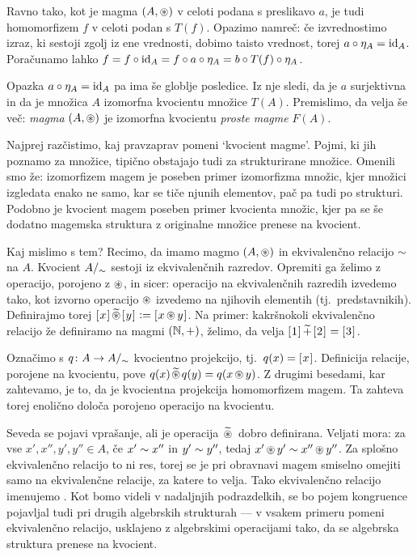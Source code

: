 Ravno tako, kot je magma $(A, \oper)$ v celoti podana s preslikavo $a$, je tudi homomorfizem $f$ v celoti podan s $T(f)$. Opazimo namreč: če izvrednostimo izraz, ki sestoji zgolj iz ene vrednosti, dobimo taisto vrednost, torej $a \circ \eta_A = \id[A]$. Poračunamo lahko $f = f \circ \id[A] = f \circ a \circ \eta_A = b \circ T(f) \circ \eta_A$.

Opazka $a \circ \eta_A = \id[A]$ pa ima še globlje posledice. Iz nje sledi, da je $a$ surjektivna in da je  množica $A$ izomorfna kvocientu množice $T(A)$. Premislimo, da velja še več: \emph{magma} $(A, \oper)$ je izomorfna kvocientu \emph{proste magme} $F(A)$.

Najprej razčistimo, kaj pravzaprav pomeni `kvocient magme'. Pojmi, ki jih poznamo za množice, tipično obstajajo tudi za strukturirane množice. Omenili smo že: izomorfizem magem je poseben primer izomorfizma množic, kjer množici izgledata enako ne samo, kar se tiče njunih elementov, pač pa tudi po strukturi. Podobno je kvocient magem poseben primer kvocienta množic, kjer pa se še dodatno magemska struktura z originalne množice prenese na kvocient.

Kaj mislimo s tem? Recimo, da imamo magmo $(A, \oper)$ in ekvivalenčno relacijo $\equ$ na $A$. Kvocient $A/_\equ$ sestoji iz ekvivalenčnih razredov. Opremiti ga želimo z operacijo, porojeno z $\oper$, in sicer: operacijo na ekvivalenčnih razredih izvedemo tako, kot izvorno operacijo $\oper$ izvedemo na njihovih elementih (tj.~predstavnikih). Definirajmo torej $\ec{x} \qo{\oper} \ec{y} \dfeq \ec{x \oper y}$. Na primer: kakršnokoli ekvivalenčno relacijo že definiramo na magmi $(\NN, +)$, želimo, da velja $\ec{1} \qo{+} \ec{2} = \ec{3}$.

Označimo s $q\colon A \to A/_\equ$ kvocientno projekcijo, tj.~$q(x) = \ec{x}$. Definicija relacije, porojene na kvocientu, pove $q(x) \qo{\oper} q(y) = q(x \oper y)$. Z drugimi besedami, kar zahtevamo, je to, da je kvocientna projekcija homomorfizem magem. Ta zahteva torej enolično določa porojeno operacijo na kvocientu.

Seveda se pojavi vprašanje, ali je operacija $\qo{\oper}$ dobro definirana. Veljati mora: za vse $x', x'', y', y'' \in A$, če $x' \equ x''$ in $y' \equ y''$, tedaj $x' \oper y' \equ x'' \oper y''$. Za splošno ekvivalenčno relacijo to ni res, torej se je pri obravnavi magem smiselno omejiti samo na ekvivalenčne relacije, za katere to velja. Tako ekvivalenčno relacijo imenujemo . Kot bomo videli v nadaljnjih podrazdelkih, se bo pojem kongruence pojavljal tudi pri drugih algebrskih strukturah --- v vsakem primeru pomeni ekvivalenčno relacijo, usklajeno z algebrskimi operacijami tako, da se algebrska struktura prenese na kvocient.

